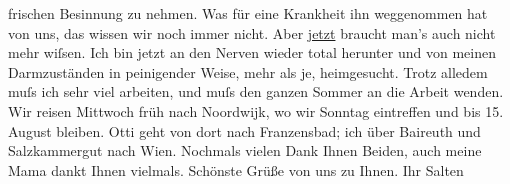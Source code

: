 \begin{ledgroupsized}[t]{13cm}
               frischen Besinnung zu nehmen. Was für eine Krankheit ihn weggenommen hat von uns, das
               wissen wir noch immer nicht. Aber \uline{jetzt} braucht man’s
               auch nicht mehr wiſsen. Ich bin jetzt an den Nerven wieder total herunter und von
               meinen Darmzuständen in peinigender Weise, mehr als je, heimgesucht. Trotz alledem
               muſs ich sehr viel arbeiten, und muſs den ganzen Sommer an die Arbeit wenden. Wir
               reisen Mittwoch früh nach Noordwijk, wo wir
               Sonntag eintreffen und bis 15. August bleiben. Otti geht von dort nach Franzensbad; ich
               über Baireuth und Salzkammergut nach Wien. \pend
           \pstart
           Nochmals vielen Dank Ihnen Beiden, auch meine Mama dankt Ihnen vielmals. Schönste Grüße von uns zu Ihnen.\pend
           \pstart Ihr \spacefill\mbox{Salten}\pend{}
         
         \endnumbering{}\end{ledgroupsized}\begin{anhang}\end{anhang}\newcommand{\dateiname}{L03497}\newcommand{\titel}{Felix Salten an Arthur Schnitzler, 5. 7. 1908}\newcommand{\editorInnen}{Martin Anton Müller und Laura Untner}
      